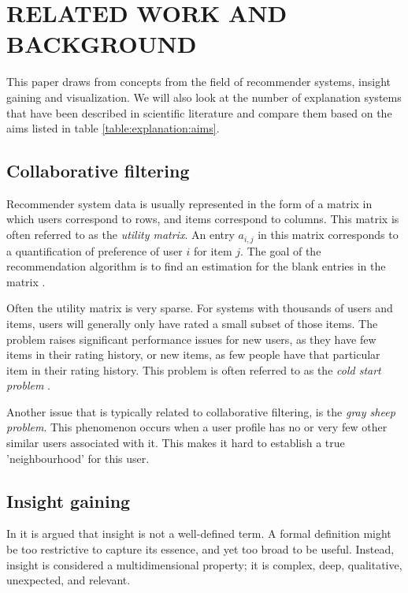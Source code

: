 \documentclass[a4paper,10pt,twocolumn]{article}
\begin{document}
\section{RELATED WORK AND BACKGROUND}\label{section:related_work}


This paper draws from concepts from the field of recommender systems, insight gaining and visualization. We will also look at the number of explanation systems that have been described in scientific literature and compare them based on the aims listed in table \ref{table:explanation:aims}.


\subsection{Collaborative filtering}

Recommender system data is usually represented in the form of a matrix in which users correspond to rows, and items correspond to columns. This matrix is often referred to as the \emph{utility matrix}. An entry $a_{i,j}$ in this matrix corresponds to a quantification of preference of user $i$ for item $j$. The goal of the recommendation algorithm is to find an estimation for the blank entries in the matrix \cite{rajaraman:2012}.

Often the utility matrix is very sparse. For systems with thousands of users and items, users will generally only have rated a small subset of those items. The problem raises significant performance issues for new users, as they have few items in their rating history, or new items, as few people have that particular item in their rating history. This problem is often referred to as the \emph{cold start problem} \cite{herlocker:2000, rajaraman:2012}.

Another issue that is typically related to collaborative filtering, is the \emph{gray sheep problem}. This phenomenon occurs when a user profile has no or very few other similar users associated with it. This makes it hard to establish a true 'neighbourhood' for this user\cite{zhao:2010}.


\subsection{Insight gaining}

In \cite{north:2006} it is argued that insight is not a well-defined term. A formal definition might be too restrictive to capture its essence, and yet too broad to be useful. Instead, insight is considered a multidimensional property; it is complex, deep, qualitative, unexpected, and relevant\cite{north:2006, yi:2008}.
\end{document}
